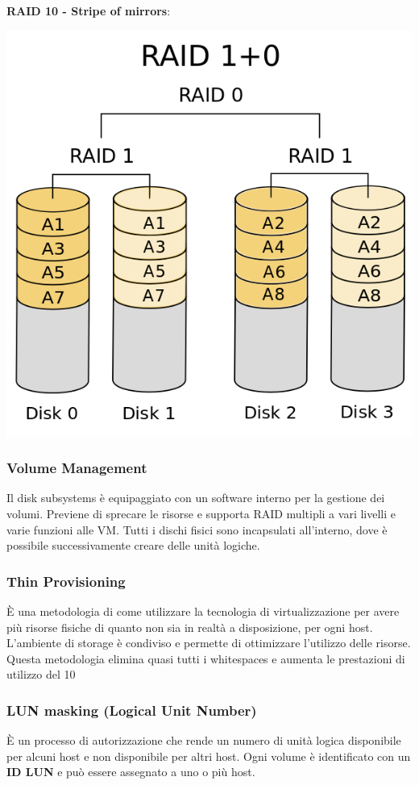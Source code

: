 \documentclass[8pt,a4paper]{extarticle}
\begin{document}
\begin{multicols*}{4}
\begin{center}
  		\end{center}
\textbf{RAID 10 - Stripe of mirrors}:
			\begin{center}
    			\includegraphics[width=.5\linewidth]{src/raid10.png}
  		\end{center}
\subsubsection{Volume Management}
Il disk subsystems è equipaggiato con un software interno per la gestione dei volumi. Previene di sprecare le risorse e supporta RAID multipli a vari livelli e varie funzioni alle VM. Tutti i dischi fisici sono incapsulati all'interno, dove è possibile successivamente creare delle unità logiche.

\subsubsection{Thin Provisioning}
È una metodologia di come utilizzare la tecnologia di virtualizzazione per avere più risorse fisiche di quanto non sia in realtà a disposizione, per ogni host. L'ambiente di storage è condiviso e permette di ottimizzare l'utilizzo delle risorse. Questa metodologia elimina quasi tutti i whitespaces e aumenta le prestazioni di utilizzo del 10%

\subsubsection{LUN masking (Logical Unit Number)}
È un processo di autorizzazione che rende un numero di unità logica disponibile per alcuni host e non disponibile per altri host. Ogni volume è identificato con un \textbf{ID LUN} e può essere assegnato a uno o più host.


\end{multicols*}
\end{document}
